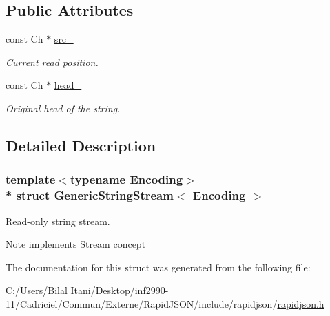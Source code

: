 \subsection*{Public Attributes}
\begin{DoxyCompactItemize}
\item 
const Ch $\ast$ \hyperlink{struct_generic_string_stream_aeda813798e3f2d6bfdac86afc11b6b80}{src\+\_\+}\hypertarget{struct_generic_string_stream_aeda813798e3f2d6bfdac86afc11b6b80}{}\label{struct_generic_string_stream_aeda813798e3f2d6bfdac86afc11b6b80}

\begin{DoxyCompactList}\small\item\em Current read position. \end{DoxyCompactList}\item 
const Ch $\ast$ \hyperlink{struct_generic_string_stream_a3c86ef1e1f0655028cb8a3afce11ee4f}{head\+\_\+}\hypertarget{struct_generic_string_stream_a3c86ef1e1f0655028cb8a3afce11ee4f}{}\label{struct_generic_string_stream_a3c86ef1e1f0655028cb8a3afce11ee4f}

\begin{DoxyCompactList}\small\item\em Original head of the string. \end{DoxyCompactList}\end{DoxyCompactItemize}


\subsection{Detailed Description}
\subsubsection*{template$<$typename Encoding$>$\\*
struct Generic\+String\+Stream$<$ Encoding $>$}

Read-\/only string stream. 

\begin{DoxyNote}{Note}
implements Stream concept 
\end{DoxyNote}


The documentation for this struct was generated from the following file\+:\begin{DoxyCompactItemize}
\item 
C\+:/\+Users/\+Bilal Itani/\+Desktop/inf2990-\/11/\+Cadriciel/\+Commun/\+Externe/\+Rapid\+J\+S\+O\+N/include/rapidjson/\hyperlink{rapidjson_8h}{rapidjson.\+h}\end{DoxyCompactItemize}
